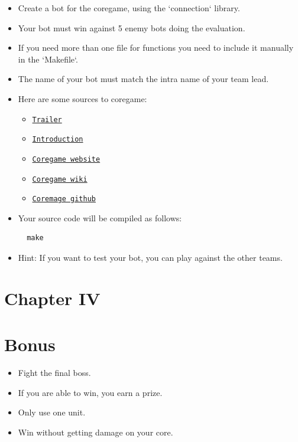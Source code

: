 \documentclass[12pt]{article}
\begin{document}
\begin{itemize}
  \item Create a bot for the coregame, using the `connection` library.
  
  \item Your bot must win against 5 enemy bots doing the evaluation.
  
  \item If you need more than one file for functions you need to include it manually in the `Makefile`.
  
  \item The name of your bot must match the intra name of your team lead.
  
  \item Here are some sources to coregame:
  \begin{itemize}
    \item \href{https://youtu.be/gMmBgHnb8Nc?si=Thm0HOCfNIZbfCnI}{\texttt{Trailer}}
    \item \href{https://shattereddisk.github.io/rickroll/rickroll.mp4}{\texttt{Introduction}}
    \item \href{https://coregame.de}{\texttt{Coregame website}}
    \item \href{https://wiki.coregame.de}{\texttt{Coregame wiki}}
    \item \href{https://github.com/42core-team}{\texttt{Coremage github}}
  \end{itemize}
  
  \item Your source code will be compiled as follows:
  
  \begin{verbatim}
  make
  \end{verbatim}
  
  \item Hint: If you want to test your bot, you can play against the other teams.
\end{itemize}

\newpage

\section*{\LARGE Chapter IV}
\section*{\LARGE Bonus}

\begin{itemize}
  \item Fight the final boss.
  \item If you are able to win, you earn a prize.
  \item Only use one unit.
  \item Win without getting damage on your core.
\end{itemize}
\end{document}
